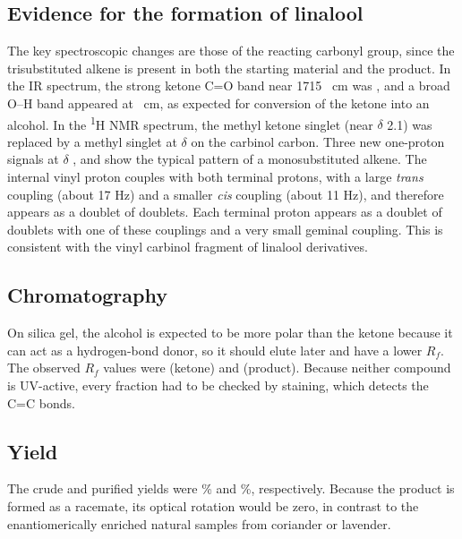 \documentclass[11pt,a4paper]{article}
\begin{document}
\subsection{Evidence for the formation of linalool}
The key spectroscopic changes are those of the reacting carbonyl group, since the trisubstituted alkene is present in both the starting material and the product. In the IR spectrum, the strong ketone C=O band near 1715 \si{\per\centi\metre} was , and a broad O--H band appeared at  \si{\per\centi\metre}, as expected for conversion of the ketone into an alcohol.\cite{Pavia} In the \textsuperscript{1}H NMR spectrum, the methyl ketone singlet (near $\delta$ 2.1) was replaced by a methyl singlet at $\delta$  on the carbinol carbon. Three new one-proton signals at $\delta$ ,  and  show the typical pattern of a monosubstituted alkene. The internal vinyl proton couples with both terminal protons, with a large \emph{trans} coupling (about 17 Hz) and a smaller \emph{cis} coupling (about 11 Hz), and therefore appears as a doublet of doublets. Each terminal proton appears as a doublet of doublets with one of these couplings and a very small geminal coupling. This is consistent with the vinyl carbinol fragment of linalool derivatives.\cite{Elsharif2015}

\subsection{Chromatography}
On silica gel, the alcohol is expected to be more polar than the ketone because it can act as a hydrogen-bond donor, so it should elute later and have a lower $R_f$. The observed $R_f$ values were  (ketone) and  (product).  Because neither compound is UV-active, every fraction had to be checked by  staining, which detects the C=C bonds.

\subsection{Yield}
The crude and purified yields were \% and \%, respectively. 
Because the product is formed as a racemate, its optical rotation would be zero, in contrast to the enantiomerically enriched natural samples from coriander or lavender.
\end{document}
